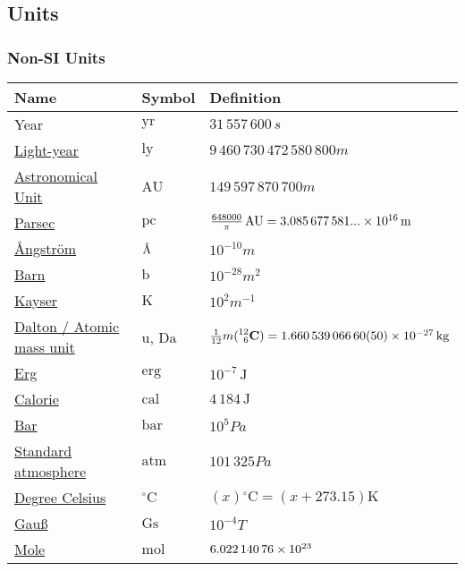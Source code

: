 	\subsection{Units}
		\subsubsection{Non-SI Units}
			\begin{center}
				\begin{tabular}{| L{.35\textwidth} L{.15\textwidth} L{.4\textwidth} |}
					\hline
					Name & Symbol & Definition \\ \hline \hline
					Year & $\mathrm{yr}$ & $31\,557\,600\,\unit{s}$ \\ \hline
					\href{https://en.wikipedia.org/wiki/Light-year}{Light-year} & $\mathrm{ly}$ & $9\,460\,730\,472\,580\,800\unit{m}$ \\ \hline
					\href{https://en.wikipedia.org/wiki/Astronomical_unit}{Astronomical Unit} & $\mathrm{AU}$ & $149\,597\,870\,700\unit{m}$ \\ \hline
					\href{https://en.wikipedia.org/wiki/Parsec}{Parsec} & $\mathrm{pc}$ & $\frac{648000}{\pi}\,\mathrm{AU} = 3.085\,677\,581...\times 10^{16}\,\mathrm{m}$ \\ \hline
					\href{https://en.wikipedia.org/wiki/Angstrom}{\r{A}ngström} & ${\mbox{\normalfont\AA}}$ & $10^{-10}\unit{m}$ \\ \hline
					\href{https://en.wikipedia.org/wiki/Barn_(unit)}{Barn} & $\mathrm{b}$ & $10^{-28}\unit{m^2}$ \\ \hline
					\href{https://en.wikipedia.org/wiki/Wavenumber#In_spectroscopy}{Kayser} & $\mathrm{K}$ & $10^2\unit{m^{-1}}$ \\ \hline
					\href{https://en.wikipedia.org/wiki/Dalton_(unit)}{Dalton / Atomic mass unit} & $\mathrm{u}$, $\mathrm{Da}$ & $\frac{1}{12}m(\prescript{12}{6}{\mathbf{C}}) = 1.660\,539\,066\,60(50)\times 10^{-27}\,\mathrm{kg}$ \\ \hline
					\href{https://en.wikipedia.org/wiki/Erg}{Erg} & $\mathrm{erg}$ & $10^{-7}\,\mathrm{J}$ \\ \hline
					\href{https://en.wikipedia.org/wiki/Calorie}{Calorie} & $\mathrm{cal}$ & $4\,184\,\mathrm{J}$ \\ \hline
					\href{https://en.wikipedia.org/wiki/Bar_(unit)}{Bar} & $\mathrm{bar}$ & $10^5\unit{Pa}$ \\ \hline
					\href{https://en.wikipedia.org/wiki/Standard_atmosphere_(unit)}{Standard atmosphere} & $\mathrm{atm}$ & $101\,325\unit{Pa}$ \\ \hline
					\href{https://en.wikipedia.org/wiki/Celsius}{Degree Celsius} & $\mathrm{^\circ C}$ & $(x)\mathrm{^\circ C}=(x+273.15)\mathrm{K}$ \\ \hline
					\href{https://en.wikipedia.org/wiki/Gauss_(unit)}{Gauß} & $\mathrm{Gs}$ & $10^{-4}\unit{T}$ \\ \hline
					\href{https://en.wikipedia.org/wiki/Mole_(unit)}{Mole} & $\mathrm{mol}$ & $6.022\,140\,76\times 10^{23}$ \\ \hline
				\end{tabular}
			\end{center}

